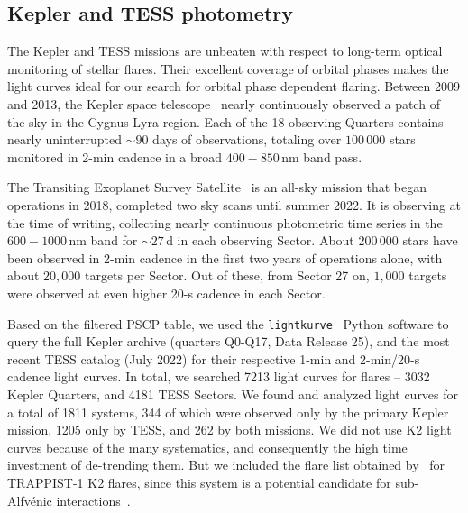 \documentclass[twocolumn]{aastex631}
\begin{document}
\subsection{Kepler and TESS photometry}
\label{sec:data:photometry}
The Kepler and TESS missions are unbeaten with respect to long-term optical monitoring of stellar flares. Their excellent coverage of orbital phases makes the light curves ideal for our search for orbital phase dependent flaring. Between 2009 and 2013, the Kepler space telescope~\citep{koch2010kepler} nearly continuously observed a patch of the sky in the Cygnus-Lyra region. Each of the 18 observing Quarters contains nearly uninterrupted $\sim 90$ days of observations, totaling over $100\,000$ stars monitored in 2-min cadence in a broad $400-850\,$nm band pass.

The Transiting Exoplanet Survey Satellite~\citep[TESS,][]{ricker2015transiting} is an all-sky mission that began operations in 2018, completed two sky scans until summer 2022. It is observing at the time of writing, collecting nearly continuous photometric time series in the $600-1000\,$nm band for $\sim 27\,$d in each observing Sector. About $200\,000$ stars have been observed in 2-min cadence in the first two years of operations alone, with about $20,000$ targets per Sector. Out of these, from Sector 27 on, $1,000$ targets were observed at even higher 20-s cadence in each Sector. 

Based on the filtered PSCP table, we used the \texttt{lightkurve}~\citep{lightkurvecollaboration2018lightkurve} Python software to query the full Kepler archive (quarters Q0-Q17, Data Release 25), and the most recent TESS catalog (July 2022) for their respective 1-min and 2-min/20-s cadence light curves. In total, we searched 7213 light curves for flares -- 3032 Kepler Quarters, and 4181 TESS Sectors. We found and analyzed light curves for a total of 1811 systems, 344 of which were observed only by the primary Kepler mission, 1205 only by TESS, and 262 by both missions. We did not use K2 light curves because of the many systematics, and consequently the high time investment of de-trending them. But we included the flare list obtained by~\citet{paudel2018k2} for TRAPPIST-1 K2 flares, since this system is a potential candidate for sub-Alfv\'enic interactions~\citep{fischer2019timevariable}.
\end{document}
